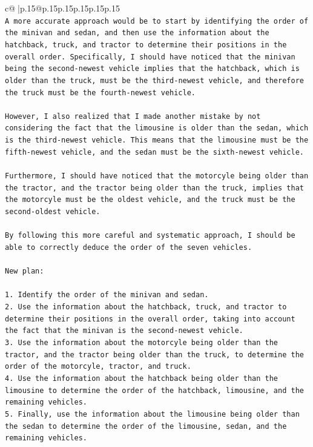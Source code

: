 \documentclass{article}
\begin{document}
{\begin{supertabular}{c@{$\;$}|p{.15\linewidth}@{}p{.15\linewidth}p{.15\linewidth}p{.15\linewidth}p{.15\linewidth}p{.15\linewidth}}
{{{\\ 
\texttt{A more accurate approach would be to start by identifying the order of the minivan and sedan, and then use the information about the hatchback, truck, and tractor to determine their positions in the overall order. Specifically, I should have noticed that the minivan being the second{-}newest vehicle implies that the hatchback, which is older than the truck, must be the third{-}newest vehicle, and therefore the truck must be the fourth{-}newest vehicle.} \\
\\ 
\texttt{However, I also realized that I made another mistake by not considering the fact that the limousine is older than the sedan, which is the third{-}newest vehicle. This means that the limousine must be the fifth{-}newest vehicle, and the sedan must be the sixth{-}newest vehicle.} \\
\\ 
\texttt{Furthermore, I should have noticed that the motorcyle being older than the tractor, and the tractor being older than the truck, implies that the motorcyle must be the oldest vehicle, and the truck must be the second{-}oldest vehicle.} \\
\\ 
\texttt{By following this more careful and systematic approach, I should be able to correctly deduce the order of the seven vehicles.} \\
\\ 
\texttt{New plan: } \\
\\ 
\texttt{1. Identify the order of the minivan and sedan.} \\
\texttt{2. Use the information about the hatchback, truck, and tractor to determine their positions in the overall order, taking into account the fact that the minivan is the second{-}newest vehicle.} \\
\texttt{3. Use the information about the motorcyle being older than the tractor, and the tractor being older than the truck, to determine the order of the motorcyle, tractor, and truck.} \\
\texttt{4. Use the information about the hatchback being older than the limousine to determine the order of the hatchback, limousine, and the remaining vehicles.} \\
\texttt{5. Finally, use the information about the limousine being older than the sedan to determine the order of the limousine, sedan, and the remaining vehicles.} \\
}}}
\end{supertabular}}
\end{document}
